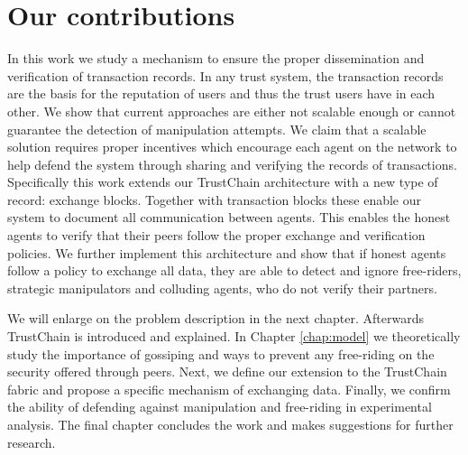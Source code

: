 

\section{Our contributions}
In this work we study a mechanism to ensure the proper dissemination and verification of transaction
records. In any trust system, the transaction records are the basis for the reputation of users and 
thus the trust users have in each other. We show that current approaches are either not scalable 
enough or cannot guarantee the detection of manipulation attempts. We claim that a scalable solution
requires proper incentives which encourage each agent on the network to help defend the system through
sharing and verifying the records of transactions. Specifically this work extends our TrustChain 
architecture with a new type of record: exchange blocks. Together with transaction blocks these 
enable our system to document all communication between agents. This enables the honest agents to 
verify that their peers follow the proper exchange and verification policies. We further implement
this architecture and show that if honest agents follow a policy to exchange all data, they are 
able to detect and ignore free-riders, strategic manipulators and colluding agents, who do 
not verify their partners.

We will enlarge on the problem description in the next chapter. Afterwards TrustChain is introduced
and explained. In Chapter \ref{chap:model} we theoretically study the importance of gossiping and 
ways to prevent any free-riding on the security offered through peers. Next, we define our extension
to the TrustChain fabric and propose a specific mechanism of exchanging data. Finally, we confirm the 
ability of defending against manipulation and free-riding in experimental analysis. 
The final chapter concludes the work and makes suggestions for further research.